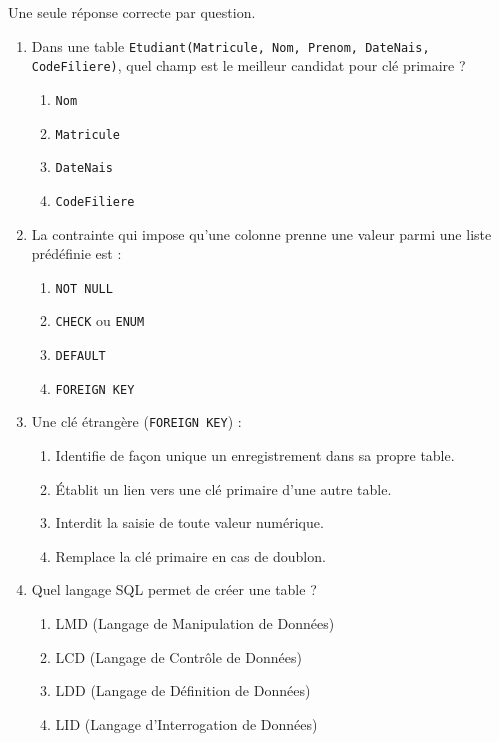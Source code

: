 \documentclass[11pt]{article}
\begin{document}
\begin{exercice}
Une seule réponse correcte par question.
\begin{enumerate}
    \item Dans une table \texttt{Etudiant(Matricule, Nom, Prenom, DateNais, CodeFiliere)}, quel champ est le meilleur candidat pour clé primaire ?
    \begin{enumerate}
        \item \texttt{Nom}
        \item \texttt{Matricule}
        \item \texttt{DateNais}
        \item \texttt{CodeFiliere}
    \end{enumerate}
    \item La contrainte qui impose qu'une colonne prenne une valeur parmi une liste prédéfinie est :
    \begin{enumerate}
        \item \texttt{NOT NULL}
        \item \texttt{CHECK} ou \texttt{ENUM}
        \item \texttt{DEFAULT}
        \item \texttt{FOREIGN KEY}
    \end{enumerate}
    \item Une clé étrangère (\texttt{FOREIGN KEY}) :
    \begin{enumerate}
        \item Identifie de façon unique un enregistrement dans sa propre table.
        \item Établit un lien vers une clé primaire d'une autre table.
        \item Interdit la saisie de toute valeur numérique.
        \item Remplace la clé primaire en cas de doublon.
    \end{enumerate}
    \item Quel langage SQL permet de créer une table ?
    \begin{enumerate}
        \item LMD (Langage de Manipulation de Données)
        \item LCD (Langage de Contrôle de Données)
        \item LDD (Langage de Définition de Données)
        \item LID (Langage d'Interrogation de Données)
    \end{enumerate}
\end{enumerate}
\end{exercice}
\end{document}
